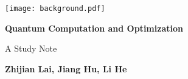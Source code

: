 \documentclass[
	11pt, %
	fleqn, %
	a4paper, %
]{LegrandOrangeBook}
\begin{document}

\titlepage %
	{\texttt{[image: background.pdf]}} %
	{ %
		\centering\sffamily %
		{\Huge\bfseries
            Quantum Computation and Optimization
            \par} %
		\vspace{16pt} %
		{\LARGE A Study Note\par} %
		\vspace{24pt} %
		{\huge\bfseries
            Zhijian Lai, 
            Jiang Hu, 
            Li He
            \par} %
	}







\end{document}
